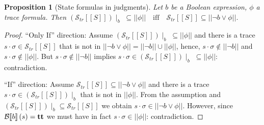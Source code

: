 \documentclass[10pt,a4paper]{amsart}
\newtheorem{proposition}[theorem]{Proposition}
\theoremstyle{definition}
\newcommand{\denot}[1]{\left[\!\left[#1\right]\!\right]}
\newcommand{\fdenot}[1]{\left|\!\left|#1\right|\!\right|}
\newcommand{\bexdenot}[1]{\mathcal{B}\!\denot{#1}}
\newcommand{\trcdenot}[1]{\mathcal{S}_{\mathit{tr}}\!\denot{#1}}
\newcommand{\ttt}{\mbox{\bf tt}}
\begin{document}
\begin{proposition}[State formulas in judgments]
  \label{prop:state-judge}
  Let $b$ be a Boolean expression, $\phi$ a trace formula. Then
  $
    (\trcdenot{S})\!\!\mid_b\; \subseteq \fdenot{\phi}
    \quad\text{iff}\quad
    \trcdenot{S} \subseteq \fdenot{\lnot b\lor\phi}.
  $  
\end{proposition}

\begin{proof}%
  ``Only If'' direction:
  Assume $(\trcdenot{S})\!\!\mid_b\;\subseteq \fdenot{\phi}$ and there
  is a trace $s\cdot\sigma\in\trcdenot{S}$ that is not in
  $\fdenot{\lnot b\lor\phi}=\fdenot{\lnot b}\cup\fdenot{\phi}$, hence,
  $s\cdot\sigma\not\in\fdenot{\lnot b}$ and
  $s\cdot\sigma\not\in\fdenot{\phi}$. But
  $s\cdot\sigma\not\in\fdenot{\lnot b}$ implies
  $s\cdot\sigma\in(\trcdenot{S})\!\!\mid_b\;\subseteq\fdenot{\phi}$:
  contradiction.

  ``If'' direction:
  Assume $\trcdenot{S} \subseteq \fdenot{\lnot b\lor\phi}$ and there
  is a trace $s\cdot\sigma\in(\trcdenot{S})\!\!\mid_b$ that is not in
  $\fdenot{\phi}$. From the assumption and
  $(\trcdenot{S})\!\!\mid_b\subseteq\trcdenot{S}$ we obtain
  $s\cdot\sigma\in\fdenot{\lnot b\lor\phi}$.  However, since
  $\bexdenot{b} (s) = \ttt$ we must have in fact
  $s\cdot\sigma\in\fdenot{\phi}$: contradiction.
\end{proof}
\end{document}
